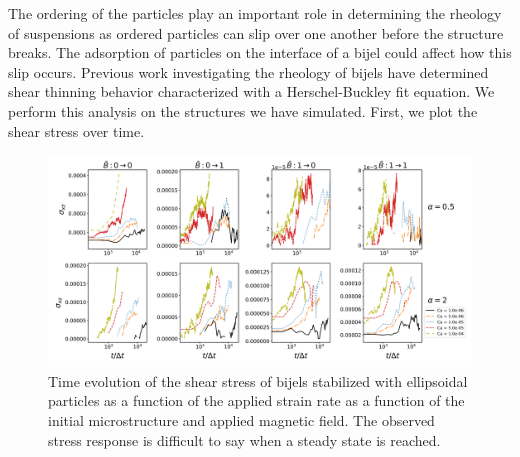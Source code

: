 The ordering of the particles play an important role in determining the rheology of suspensions as ordered particles can slip over one another
before the structure breaks. The adsorption of particles on the interface of a bijel could affect how this slip occurs. Previous work investigating
the rheology of bijels have determined shear thinning behavior characterized with a Herschel-Buckley fit equation. \cite{macmillan_rheological_2019} 
We perform this analysis on the structures we have simulated. First, we plot the shear stress over time.

\begin{figure} 
    \centering 
    \includegraphics[scale=0.3]{../figures/results/paper3/stress-time_compare.png} 
    \caption{Time evolution of the shear stress of bijels stabilized with ellipsoidal particles as a function of the applied strain rate as
             a function of the initial microstructure and applied magnetic field. The observed stress response is difficult to say when a steady
             state is reached.} 
    \label{fig:stress_time} 
\end{figure}

